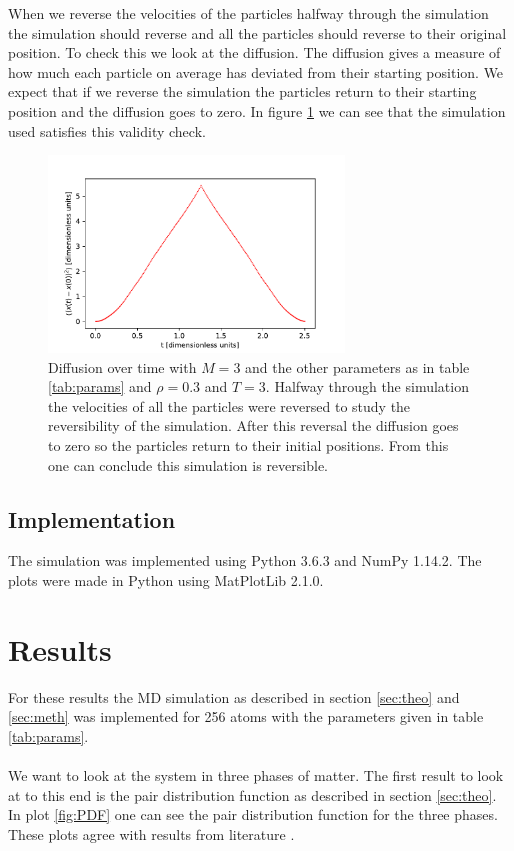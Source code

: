 \documentclass[10 pt, a4paper]{article}
\begin{document}
When we reverse the velocities of the particles halfway through the simulation the simulation should reverse and all the particles should reverse to their original position. To check this we look at the diffusion. The diffusion gives a measure of how much each particle on average has deviated from their starting position. We expect that if we reverse the simulation the particles return to their starting position and the diffusion goes to zero. In figure \ref{fig:diffrev} we can see that the simulation used satisfies this validity check.

\begin{figure}[H]
\centering
\includegraphics[width=0.7\textwidth]{diffrev}
\caption{Diffusion over time with $M = 3$ and the other parameters as in table \ref{tab:params} and $\rho = 0.3$ and $T = 3$. Halfway through the simulation the velocities of all the particles were reversed to study the reversibility of the simulation. After this reversal the diffusion goes to zero so the particles return to their initial positions. From this one can conclude this simulation is reversible.}
\label{fig:diffrev}
\end{figure}

\subsection{Implementation}

The simulation was implemented using Python 3.6.3 and NumPy 1.14.2. The plots were made in Python using MatPlotLib 2.1.0.

\section{Results} \label{sec:results}

For these results the MD simulation as described in section \ref{sec:theo} and \ref{sec:meth} was implemented for 256 atoms with the parameters given in table \ref{tab:params}. 
\\
\\
We want to look at the system in three phases of matter. The first result to look at to this end is the pair distribution function as described in section \ref{sec:theo}. In plot \ref{fig:PDF} one can see the pair distribution function for the three phases. These plots agree with results from literature \cite{pdf}. 
\end{document}
